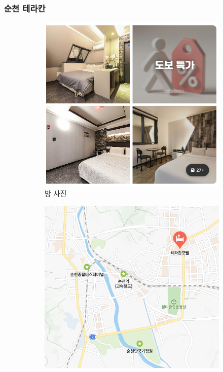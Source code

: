 \documentclass[10pt]{article}
\begin{document}
\subsubsection{순천 테라칸}
\begin{figure}[htbp]
  \centering
  \begin{subfigure}{0.3\textwidth}
    \centering
    \includegraphics[width=\linewidth]{fig/순천테라칸_방.png}
    \caption{방 사진}
    \label{fig:1}
  \end{subfigure}
  \hfill
  \begin{subfigure}{0.3\textwidth}
    \centering
    \includegraphics[width=\linewidth]{fig/순천테라칸_위치.png}

\end{subfigure}
\end{figure}
\end{document}
